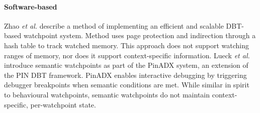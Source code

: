 \documentclass[letterpaper,twocolumn,10pt]{article}
\begin{document}


\paragraph{Software-based}
Zhao \emph{et al.} \cite{DynamoRIOWatchpoints} describe a method of implementing an efficient and scalable DBT-based watchpoint system. Method uses page protection and indirection through a hash table to track watched memory. This approach does not support watching ranges of memory, nor does it support context-specific information. Lueck \emph{et al.} \cite{PinADX} introduce semantic watchpoints as part of the PinADX system, an extension of the PIN DBT framework. PinADX enables interactive debugging by triggering debugger breakpoints when semantic conditions are met. While similar in spirit to behavioural watchpoints, semantic watchpoints do not maintain context-specific, per-watchpoint state. 

\end{document}
